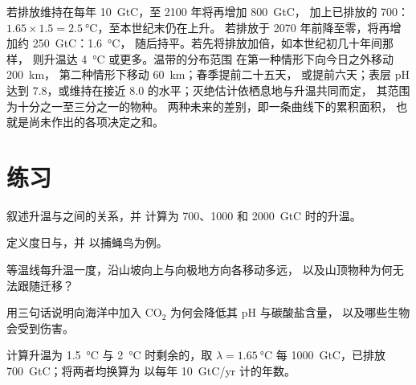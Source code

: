 \begin{example}[三种未来]\label{ex:b2:global-change:scenarios}
若排放维持在每年 \qty{10}{GtC}，至 2100 年将再增加 \qty{800}{GtC}，
加上已排放的 \qty{700}{}：$1.65\times 1.5 =
\qty{2.5}{\celsius}$，至本世纪末仍在上升。
若排放于 2070 年前降至零，将再增加约 \qty{250}{GtC}：\qty{1.6}{\celsius}，
随后持平。若先将排放加倍，如本世纪初几十年间那样，
则升温达 \qty{4}{\celsius} 或更多。温带的分布范围
在第一种情形下向今日之外移动 \qty{200}{km}，
第二种情形下移动 \qty{60}{km}；春季提前二十五天，
或提前六天；表层 pH 达到 $7.8$，或维持在接近
$8.0$ 的水平；灭绝估计依栖息地与升温共同而定，
其范围为十分之一至三分之一的物种。
两种未来的差别，即一条曲线下的累积面积，
也就是尚未作出的各项决定之和。
\end{example}

\section{练习}

\begin{exercise}[$\star$]\label{exo:b2:global-change:1}
叙述升温与之间的关系，并
计算为 700、1000 和
\qty{2000}{GtC} 时的升温。
\end{exercise}

\begin{exercise}[$\star$]\label{exo:b2:global-change:2}
定义度日与，并
以捕蝇鸟为例。
\end{exercise}

\begin{exercise}[$\star$]\label{exo:b2:global-change:3}
等温线每升温一度，沿山坡向上与向极地方向各移动多远，
以及山顶物种为何无法跟随迁移？
\end{exercise}

\begin{exercise}[$\star$]\label{exo:b2:global-change:4}
用三句话说明向海洋中加入 \ensuremath{\mathrm{CO_2}} 为何会降低其 pH 与碳酸盐含量，
以及哪些生物会受到伤害。
\end{exercise}

\begin{exercise}[$\star\star$]\label{exo:b2:global-change:5}
计算升温为 \qty{1.5}{\celsius} 与
\qty{2}{\celsius} 时剩余的，取 $\lambda = \qty{1.65}{\celsius}$ 每
\qty{1000}{GtC}，已排放 \qty{700}{GtC}；将两者均换算为
以每年 \qty{10}{GtC/yr} 计的年数。
\end{exercise}

